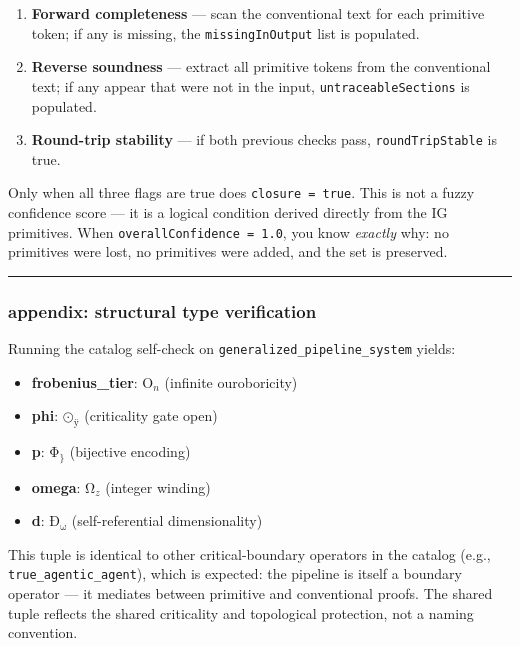 \documentclass[12pt,a4paper]{article}
\begin{document}
\begin{enumerate}
    \item \textbf{Forward completeness} --- scan the conventional text for each primitive token; if any is missing, the \texttt{missingInOutput} list is populated.
    \item \textbf{Reverse soundness} --- extract all primitive tokens from the conventional text; if any appear that were not in the input, \texttt{untraceableSections} is populated.
    \item \textbf{Round-trip stability} --- if both previous checks pass, \texttt{roundTripStable} is true.
\end{enumerate}

Only when all three flags are true does \texttt{closure = true}. This is not a fuzzy confidence score --- it is a logical condition derived directly from the IG primitives. When \texttt{overallConfidence = 1.0}, you know \emph{exactly} why: no primitives were lost, no primitives were added, and the set is preserved.

\begin{center}
\rule{0.5\textwidth}{0.4pt}
\end{center}

\subsubsection{appendix: structural type verification}

Running the catalog self-check on \texttt{generalized\_pipeline\_system} yields:

\begin{itemize}
    \item \textbf{frobenius\_tier}: O$_n$ (infinite ouroboricity)
    \item \textbf{phi}: $\text{⊙}_{\text{ÿ}}$ (criticality gate open)
    \item \textbf{p}: $\text{Φ}_{\text{\}}}$ (bijective encoding)
    \item \textbf{omega}: $\text{Ω}_{z}$ (integer winding)
    \item \textbf{d}: $\text{Ð}_{\text{ω}}$ (self-referential dimensionality)
\end{itemize}

This tuple is identical to other critical-boundary operators in the catalog (e.g., \texttt{true\_agentic\_agent}), which is expected: the pipeline is itself a boundary operator --- it mediates between primitive and conventional proofs. The shared tuple reflects the shared criticality and topological protection, not a naming convention.
\end{document}
